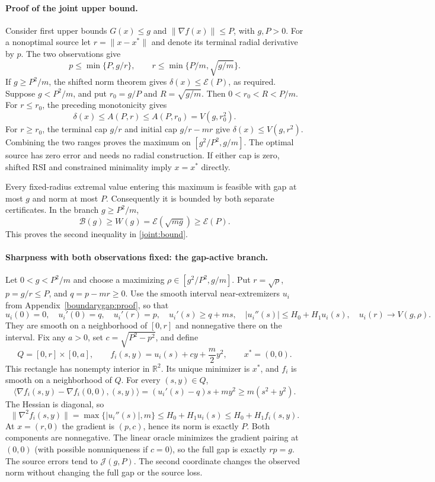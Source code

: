 \paragraph{Proof of the joint upper bound.}
Consider first upper bounds $G(x)\le g$ and
$\|\nabla f(x)\|\le P$, with $g,P>0$.
For a nonoptimal source let $r=\|x-x^*\|$ and denote its terminal
radial derivative by $p$. The two observations give
\[
 p\le\min\{P,g/r\},\qquad
 r\le\min\{P/m,\sqrt{g/m}\}.
\]
If $g\ge P^2/m$, the shifted norm theorem gives
$\delta(x)\le\mathcal E(P)$, as required.
Suppose $g<P^2/m$, and put $r_0=g/P$ and $R=\sqrt{g/m}$.
Then $0<r_0<R<P/m$.
For $r\le r_0$, the preceding monotonicity gives
\[
 \delta(x)\le A(P,r)\le A(P,r_0)=V(g,r_0^2).
\]
For $r\ge r_0$, the terminal cap $g/r$ and initial cap
$g/r-mr$ give $\delta(x)\le V(g,r^2)$.
Combining the two ranges proves the maximum on
$[g^2/P^2,g/m]$. The optimal source has zero error and needs no
radial construction. If either cap is zero, shifted RSI and
constrained minimality imply $x=x^*$ directly.

Every fixed-radius extremal value entering this maximum is feasible
with gap at most $g$ and norm at most $P$. Consequently it is bounded
by both separate certificates. In the branch $g\ge P^2/m$,
\[
 \mathcal B(g)\ge W(g)=\mathcal E(\sqrt{mg})\ge\mathcal E(P).
\]
This proves the second inequality in \eqref{joint:bound}.

\paragraph{Sharpness with both observations fixed: the gap-active branch.}
Let $0<g<P^2/m$ and choose a maximizing
$\rho\in[g^2/P^2,g/m]$. Put $r=\sqrt\rho$,
$p=g/r\le P$, and $q=p-mr\ge0$.
Use the smooth interval near-extremizers $u_i$ from
Appendix~\ref{boundarygap:proof}, so that
\[
 u_i(0)=0,\quad u_i'(0)=q,\quad u_i'(r)=p,\quad
 u_i'(s)\ge q+ms,\quad
 |u_i''(s)|\le H_0+H_1u_i(s),\quad
 u_i(r)\longrightarrow V(g,\rho).
\]
They are smooth on a neighborhood of $[0,r]$ and nonnegative there
on the interval. Fix any $a>0$, set $c=\sqrt{P^2-p^2}$, and define
\[
 Q=[0,r]\times[0,a],\qquad
 f_i(s,y)=u_i(s)+cy+\frac m2y^2,\qquad x^*=(0,0).
\]
This rectangle has nonempty interior in $\mathbb R^2$.
Its unique minimizer is $x^*$, and $f_i$ is smooth on a neighborhood
of $Q$. For every $(s,y)\in Q$,
\[
 \langle\nabla f_i(s,y)-\nabla f_i(0,0),(s,y)\rangle
 =(u_i'(s)-q)s+my^2\ge m(s^2+y^2).
\]
The Hessian is diagonal, so
\[
 \|\nabla^2f_i(s,y)\|
 =\max\{|u_i''(s)|,m\}
 \le H_0+H_1u_i(s)\le H_0+H_1f_i(s,y).
\]
At $x=(r,0)$ the gradient is $(p,c)$, hence its norm is exactly
$P$. Both components are nonnegative. The linear oracle minimizes
the gradient pairing at $(0,0)$ (with possible nonuniqueness if
$c=0$), so the full gap is exactly $rp=g$.
The source errors tend to $\mathcal J(g,P)$.
The second coordinate changes the observed norm without changing
the full gap or the source loss.

